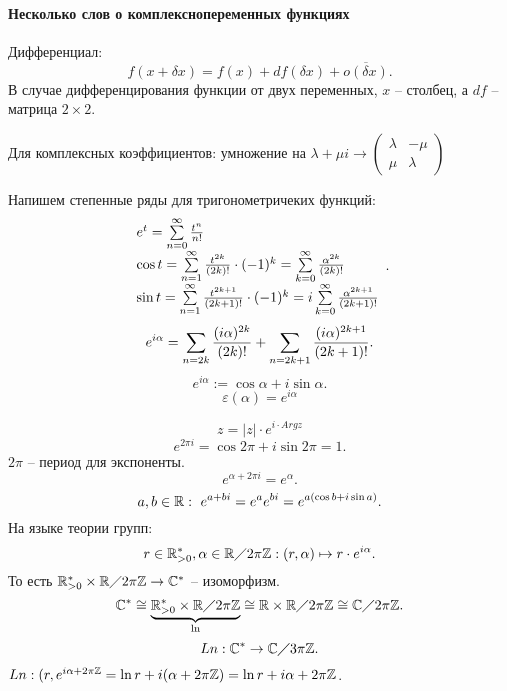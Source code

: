 \documentclass[12pt]{report}
\begin{document}
\paragraph{Несколько слов о комплекснопеременных функциях}
\begin{defn}
    Дифференциал: \[
	f(x + \delta  x) = f(x) + df( \delta  x) + \overline{o( \delta  x)}
    .\] 
    В случае дифференцирования функции от двух переменных, $x$ -- столбец, а $df$ -- матрица $2 \times 2$.
\end{defn}
\begin{note}
    Для комплексных коэффициентов:
    умножение на $\lambda + \mu i \to  
    \left (
    \begin{array}{cc}
	\lambda & - \mu \\
	\mu & \lambda
    \end{array}
\right )
    $ 
\end{note}
\begin{st}
    Напишем степенные ряды для тригонометричеких функций:
    \[
	\begin{array}{l}
	    e^{t} = \sum\limits_{n=0}^{\infty} \frac{t ^{n}}{n!}\\
	    \cos t = \sum\limits_{n=1}^{ \infty} \frac{t ^{2k}}{(2k)!} \cdot (-1)^{k} = \sum\limits_{k=0}^{\infty} \frac{ \alpha ^{2k}}{(2k)!}\\
	    \sin t = \sum\limits_{n=1}^{ \infty} \frac{t ^{2k+1}}{(2k+1)!} \cdot (-1)^{k} = i\sum\limits_{k=0}^{\infty} \frac{ \alpha ^{2k+1}}{(2k+1)!}
    \end{array} 
    .\] 
    \[
	e ^{i \alpha} = \slim_{n= 2k} \frac{(i\alpha)^{2k}}{(2k)!} + \slim_{n= 2k+1}\frac{(i \alpha )^{2k+1}}{(2k+1)!} %
    .\] 
    \[
    e ^{i \alpha} := \cos \alpha + i \sin \alpha 
    .\] 
    $$ \varepsilon  ( \alpha ) = e ^{i \alpha }$$
\end{st}
\begin{note}
    $$z = |z| \cdot e ^{i \cdot Arg z}$$
    \[
    e^{2\pi i} = \cos 2\pi + i \sin 2\pi = 1
    .\] 
    $2
    \pi$ -- период для экспоненты.
    \[
    e ^{\alpha + 2\pi i} = e^{ \alpha }
    .\] 
    \[
	a, b \in  \mathbb{R}: ~ e^{a + bi} = e ^{ a} e ^{bi} = e^{a ( \cos b + i \sin a)}    
    .\] 
    На языке теории групп:
    \[
	r \in  \mathbb{R}^{*}_{>0} , \alpha  \in  \mathbb{R}\diagup 2 \pi \mathbb{Z}: (r, \alpha ) \mapsto r \cdot e ^{i \alpha} 
    .\] 
    То есть  $\mathbb{R}^{*}_{>0} \times  \mathbb{R}\diagup 2\pi\mathbb{Z} \to  \mathbb{C} ^{*}$ -- изоморфизм.
    \[
	\mathbb{C}^{*} \cong \underbrace{\mathbb{R}^{*}_{>0} \times  \mathbb{R}\diagup 2\pi\mathbb{Z}}_{\ln} \cong \mathbb{R} \times  \mathbb{R}\diagup 2\pi \mathbb{Z} \cong \mathbb{C}\diagup 2\pi\mathbb{Z}
    .\] 
    \[
    Ln: \mathbb{C}^{*} \to  \mathbb{C}\diagup 3\pi\mathbb{Z}
    .\] 
    $Ln: (r, e^{i\alpha + 2\pi\mathbb{Z}} = \ln r + i (\alpha + 2\pi\mathbb{Z})= \ln r + i \alpha  + 2\pi\mathbb{Z}$.
\end{note}
\end{document}

